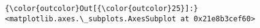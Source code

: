 \documentclass[11pt]{article}
\begin{document}
\begin{Verbatim}[commandchars=\\\{\}]
{\color{outcolor}Out[{\color{outcolor}25}]:} <matplotlib.axes.\_subplots.AxesSubplot at 0x21e8b3cef60>
\end{Verbatim}
            
    \begin{center}
    \end{center}
    { \hspace*{\fill} \\}
    
    \begin{center}
    \end{center}
    { \hspace*{\fill} \\}
    
    \begin{center}
    \end{center}
    { \hspace*{\fill} \\}
    
\end{document}
